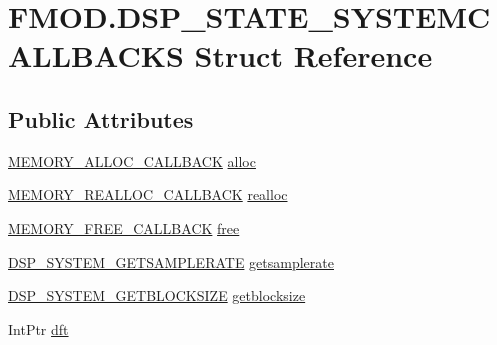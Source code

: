 \hypertarget{struct_f_m_o_d_1_1_d_s_p___s_t_a_t_e___s_y_s_t_e_m_c_a_l_l_b_a_c_k_s}{}\section{F\+M\+O\+D.\+D\+S\+P\+\_\+\+S\+T\+A\+T\+E\+\_\+\+S\+Y\+S\+T\+E\+M\+C\+A\+L\+L\+B\+A\+C\+KS Struct Reference}
\label{struct_f_m_o_d_1_1_d_s_p___s_t_a_t_e___s_y_s_t_e_m_c_a_l_l_b_a_c_k_s}
\subsection*{Public Attributes}
\begin{DoxyCompactItemize}
\item 
\hyperlink{namespace_f_m_o_d_aff9ff44d1da401acbc19faf64e06a776}{M\+E\+M\+O\+R\+Y\+\_\+\+A\+L\+L\+O\+C\+\_\+\+C\+A\+L\+L\+B\+A\+CK} \hyperlink{struct_f_m_o_d_1_1_d_s_p___s_t_a_t_e___s_y_s_t_e_m_c_a_l_l_b_a_c_k_s_a618405bc061cde10937c8815a5f3195f}{alloc}
\item 
\hyperlink{namespace_f_m_o_d_a3d035f4158c569e31902d9ad59ab43f0}{M\+E\+M\+O\+R\+Y\+\_\+\+R\+E\+A\+L\+L\+O\+C\+\_\+\+C\+A\+L\+L\+B\+A\+CK} \hyperlink{struct_f_m_o_d_1_1_d_s_p___s_t_a_t_e___s_y_s_t_e_m_c_a_l_l_b_a_c_k_s_a476908e93031d2e73a1d2ddfa3dd252c}{realloc}
\item 
\hyperlink{namespace_f_m_o_d_aa6d78ad454bb4b25659d9de9ca61fc42}{M\+E\+M\+O\+R\+Y\+\_\+\+F\+R\+E\+E\+\_\+\+C\+A\+L\+L\+B\+A\+CK} \hyperlink{struct_f_m_o_d_1_1_d_s_p___s_t_a_t_e___s_y_s_t_e_m_c_a_l_l_b_a_c_k_s_a6fcb9b86e40b9498f60693e7803a08e2}{free}
\item 
\hyperlink{namespace_f_m_o_d_a892b2030dd288ab45b132806cb408f33}{D\+S\+P\+\_\+\+S\+Y\+S\+T\+E\+M\+\_\+\+G\+E\+T\+S\+A\+M\+P\+L\+E\+R\+A\+TE} \hyperlink{struct_f_m_o_d_1_1_d_s_p___s_t_a_t_e___s_y_s_t_e_m_c_a_l_l_b_a_c_k_s_a5c984378d386274f93195d8ba805def1}{getsamplerate}
\item 
\hyperlink{namespace_f_m_o_d_aecdb732d16df868ecab07e57334b8278}{D\+S\+P\+\_\+\+S\+Y\+S\+T\+E\+M\+\_\+\+G\+E\+T\+B\+L\+O\+C\+K\+S\+I\+ZE} \hyperlink{struct_f_m_o_d_1_1_d_s_p___s_t_a_t_e___s_y_s_t_e_m_c_a_l_l_b_a_c_k_s_abf4fb1e6deb5b65406f8b791c1208609}{getblocksize}
\item 
Int\+Ptr \hyperlink{struct_f_m_o_d_1_1_d_s_p___s_t_a_t_e___s_y_s_t_e_m_c_a_l_l_b_a_c_k_s_a017d9ba177a7807af3b5a61fe14481d5}{dft}
\item 

\end{DoxyCompactItemize}

